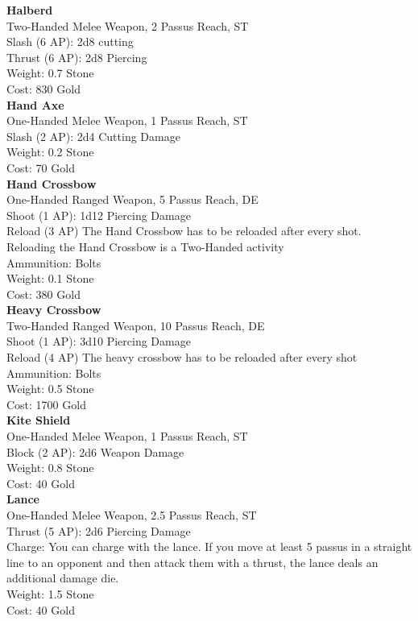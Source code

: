 \textbf{Halberd}\\
Two-Handed Melee Weapon, 2 Passus Reach, ST\\
Slash (6 AP): 2d8 cutting\\
Thrust (6 AP): 2d8 Piercing\\
Weight: 0.7 Stone\\
Cost: 830 Gold\\


\textbf{Hand Axe}\\
One-Handed Melee Weapon, 1 Passus Reach, ST\\
Slash (2 AP): 2d4 Cutting Damage\\
Weight: 0.2 Stone\\
Cost: 70 Gold\\


\textbf{Hand Crossbow}\\
One-Handed Ranged Weapon, 5 Passus Reach, DE\\
Shoot (1 AP): 1d12 Piercing Damage\\
Reload (3 AP) The Hand Crossbow has to be reloaded after every shot.\\
Reloading the Hand Crossbow is a Two-Handed activity\\
Ammunition: Bolts\\
Weight: 0.1 Stone\\
Cost: 380 Gold\\


\textbf{Heavy Crossbow}\\
Two-Handed Ranged Weapon, 10 Passus Reach, DE\\
Shoot (1 AP): 3d10 Piercing Damage\\
Reload (4 AP) The heavy crossbow has to be reloaded after every shot\\
Ammunition: Bolts\\
Weight: 0.5 Stone\\
Cost: 1700 Gold\\


\textbf{Kite Shield}\\
One-Handed Melee Weapon, 1 Passus Reach, ST\\
Block (2 AP): 2d6 Weapon Damage\\
Weight: 0.8 Stone\\
Cost: 40 Gold\\


\textbf{Lance}\\
One-Handed Melee Weapon, 2.5 Passus Reach, ST\\
Thrust (5 AP): 2d6 Piercing Damage\\
Charge: You can charge with the lance. If you move at least 5 passus in a straight line to an opponent and then attack them with a thrust, the lance deals an additional damage die.\\
Weight: 1.5 Stone\\
Cost: 40 Gold\\


